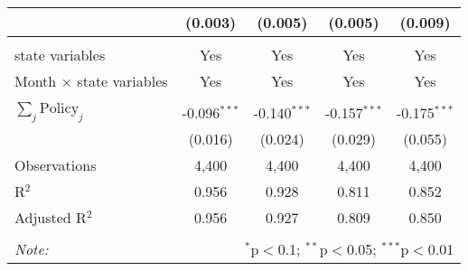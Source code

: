 \begin{tabular}{@{\extracolsep{1pt}}lcccc}
  & (0.003) & (0.005) & (0.005) & (0.009) \\ 
 \hline \\[-1.8ex] 
state variables & Yes & Yes & Yes & Yes \\ 
Month $\times$ state variables & Yes & Yes & Yes & Yes \\ 
\hline \\[-1.8ex] 
$\sum_j \mathrm{Policy}_j$ & -0.096$^{***}$ & -0.140$^{***}$ & -0.157$^{***}$ & -0.175$^{***}$ \\ 
 & (0.016) & (0.024) & (0.029) & (0.055) \\ 
Observations & 4,400 & 4,400 & 4,400 & 4,400 \\ 
R$^{2}$ & 0.956 & 0.928 & 0.811 & 0.852 \\ 
Adjusted R$^{2}$ & 0.956 & 0.927 & 0.809 & 0.850 \\ 
\hline 
\hline \\[-1.8ex] 
\textit{Note:}  & \multicolumn{4}{r}{$^{*}$p$<$0.1; $^{**}$p$<$0.05; $^{***}$p$<$0.01} \\ 
\end{tabular} 
